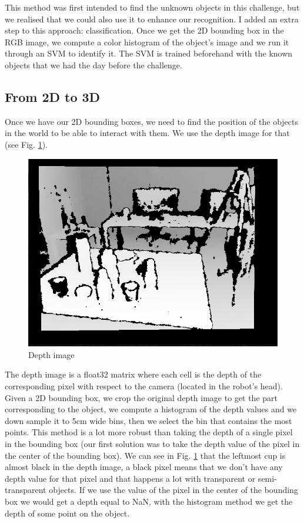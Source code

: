 \documentclass[a4paper, twocolumn]{article}
\begin{document}
    This method was first intended to find the unknown objects in this challenge, but we realised that we could also use it to enhance our recognition. I added an extra step to this approach: classification. Once we get the 2D bounding box in the RGB image, we compute a color histogram of the object's image and we run it through an SVM to identify it. The SVM is trained beforehand with the known objects that we had the day before the challenge.

    \subsection{From 2D to 3D}

    Once we have our 2D bounding boxes, we need to find the position of the objects in the world to be able to interact with them. We use the depth image for that (see Fig. \ref{depth_image}).

    \begin{figure}[!b]
        \includegraphics[width=\columnwidth]{../img/depth_image.jpg}
        \caption{Depth image}
        \label{depth_image}
    \end{figure}

    The depth image is a float32 matrix where each cell is the depth of the corresponding pixel with respect to the camera (located in the robot's head). Given a 2D bounding box, we crop the original depth image to get the part corresponding to the object, we compute a histogram of the depth values and we down sample it to 5cm wide bins, then we select the bin that contains the most points. This method is a lot more robust than taking the depth of a single pixel in the bounding box (our first solution was to take the depth value of the pixel in the center of the bounding box). We can see in Fig. \ref{depth_image} that the leftmost cup is almost black in the depth image, a black pixel means that we don't have any depth value for that pixel and that happens a lot with transparent or semi-transparent objects. If we use the value of the pixel in the center of the bounding box we would get a depth equal to NaN, with the histogram method we get the depth of some point on the object.
\end{document}
